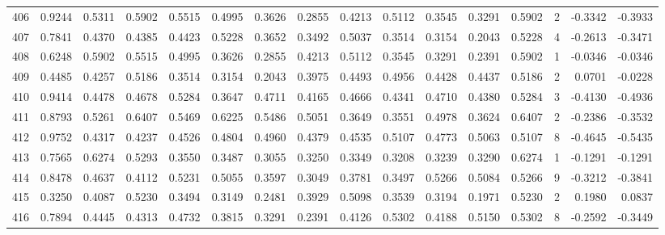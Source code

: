 \begin{tabular}{lrrrrrrrrrrrrrrr}
406 &      0.9244 &  0.5311 &  0.5902 &  0.5515 &  0.4995 &  0.3626 &  0.2855 &  0.4213 &  0.5112 &  0.3545 &   0.3291 &     0.5902 &      2 &                   -0.3342 &                    -0.3933 \\
407 &      0.7841 &  0.4370 &  0.4385 &  0.4423 &  0.5228 &  0.3652 &  0.3492 &  0.5037 &  0.3514 &  0.3154 &   0.2043 &     0.5228 &      4 &                   -0.2613 &                    -0.3471 \\
408 &      0.6248 &  0.5902 &  0.5515 &  0.4995 &  0.3626 &  0.2855 &  0.4213 &  0.5112 &  0.3545 &  0.3291 &   0.2391 &     0.5902 &      1 &                   -0.0346 &                    -0.0346 \\
409 &      0.4485 &  0.4257 &  0.5186 &  0.3514 &  0.3154 &  0.2043 &  0.3975 &  0.4493 &  0.4956 &  0.4428 &   0.4437 &     0.5186 &      2 &                    0.0701 &                    -0.0228 \\
410 &      0.9414 &  0.4478 &  0.4678 &  0.5284 &  0.3647 &  0.4711 &  0.4165 &  0.4666 &  0.4341 &  0.4710 &   0.4380 &     0.5284 &      3 &                   -0.4130 &                    -0.4936 \\
411 &      0.8793 &  0.5261 &  0.6407 &  0.5469 &  0.6225 &  0.5486 &  0.5051 &  0.3649 &  0.3551 &  0.4978 &   0.3624 &     0.6407 &      2 &                   -0.2386 &                    -0.3532 \\
412 &      0.9752 &  0.4317 &  0.4237 &  0.4526 &  0.4804 &  0.4960 &  0.4379 &  0.4535 &  0.5107 &  0.4773 &   0.5063 &     0.5107 &      8 &                   -0.4645 &                    -0.5435 \\
413 &      0.7565 &  0.6274 &  0.5293 &  0.3550 &  0.3487 &  0.3055 &  0.3250 &  0.3349 &  0.3208 &  0.3239 &   0.3290 &     0.6274 &      1 &                   -0.1291 &                    -0.1291 \\
414 &      0.8478 &  0.4637 &  0.4112 &  0.5231 &  0.5055 &  0.3597 &  0.3049 &  0.3781 &  0.3497 &  0.5266 &   0.5084 &     0.5266 &      9 &                   -0.3212 &                    -0.3841 \\
415 &      0.3250 &  0.4087 &  0.5230 &  0.3494 &  0.3149 &  0.2481 &  0.3929 &  0.5098 &  0.3539 &  0.3194 &   0.1971 &     0.5230 &      2 &                    0.1980 &                     0.0837 \\
416 &      0.7894 &  0.4445 &  0.4313 &  0.4732 &  0.3815 &  0.3291 &  0.2391 &  0.4126 &  0.5302 &  0.4188 &   0.5150 &     0.5302 &      8 &                   -0.2592 &                    -0.3449 \\

\end{tabular}
